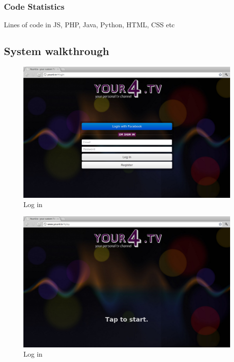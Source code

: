\subsubsection{Code Statistics}
Lines of code in JS, PHP, Java, Python, HTML, CSS etc

\subsection{System walkthrough}
\begin{figure}[th]
	\centering
	\includegraphics[width=\textwidth]{images/screenshots/your4-login.png}
	\caption{Log in}
	\label{fig:your4-login}
\end{figure}
\begin{figure}[th]
	\centering
	\includegraphics[width=\textwidth]{images/screenshots/your4-tap-to-start.png}
	\caption{Log in}
	\label{fig:your4-tap-to-start}
\end{figure}
